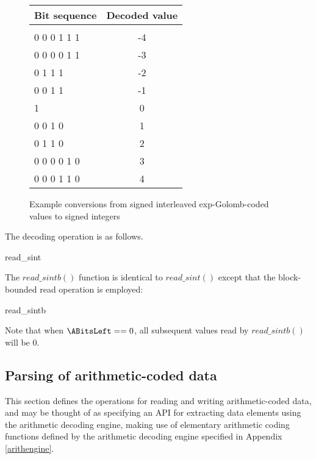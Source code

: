 \begin{figure}[!ht]
\centering
\begin{tabular}{l|c}
Bit sequence & Decoded value \\
\hline\\
0 0 0 1 1 1         &  -4\\
0 0 0 0 1 1         &  -3\\
0 1 1 1            &  -2\\
0 0 1 1           &  -1\\
1                 &  0\\
0 0 1 0           &  1\\
0 1 1 0            &  2\\
0 0 0 0 1 0         &  3\\
0 0 0 1 1 0         &  4\\
\end{tabular}

\caption{Example conversions from signed interleaved exp-Golomb-coded values 
to signed integers \label{segolcodings}}
\end{figure}

The decoding operation is as follows.

\begin{pseudo}{read\_sint}{}
  \bsEND
\bsEND
{}
\end{pseudo}

The $read\_sintb()$ function is identical to $read\_sint()$ except that the block-bounded read
operation is employed:

\begin{pseudo}{read\_sintb}{}
  \bsEND
\bsEND
{}
\end{pseudo}

Note that when $\ABitsLeft==0$, all subsequent values read by $read\_sintb()$ will be 0.

\subsection{Parsing of arithmetic-coded data}

\label{arithdecoding}

This section defines the operations for reading and writing arithmetic-coded
data, and may be thought of as specifying an API for
extracting data elements using the arithmetic decoding engine, making use
of elementary arithmetic coding functions defined by the arithmetic decoding engine 
specified in Appendix \ref{arithengine}.

